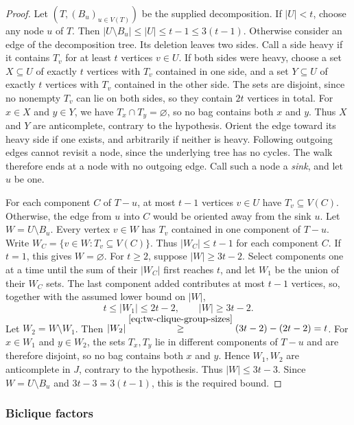 \begin{proof}
Let $(T,(B_u)_{u\in V(T)})$ be the supplied decomposition.
If $|U|<t$, choose any node $u$ of $T$. Then
$|U\setminus B_u|\leq|U|\leq t-1\leq3(t-1)$. Otherwise consider an edge of the
decomposition tree. Its deletion leaves two sides. Call a side
heavy if it contains $T_v$ for at least $t$ vertices $v\in U$.
If both sides were heavy, choose a set $X\subseteq U$ of exactly $t$
vertices with $T_v$ contained in one side, and a set
$Y\subseteq U$ of exactly $t$ vertices with $T_v$ contained in
the other side. The sets are disjoint, since no nonempty $T_v$ can
lie on both sides, so they contain $2t$ vertices in total. For
$x\in X$ and $y\in Y$, we have $T_x\cap T_y=\varnothing$, so no bag
contains both $x$ and $y$. Thus $X$ and $Y$ are anticomplete,
contrary to the hypothesis. Orient the edge toward its
heavy side if one exists, and arbitrarily if neither is heavy.
Following outgoing edges cannot revisit a node, since the underlying
tree has no cycles. The walk therefore ends at a node with no outgoing
edge. Call such a node a \emph{sink}, and let
$u$ be one.

For each component $C$ of $T-u$, at most $t-1$ vertices $v\in U$
have $T_v\subseteq V(C)$. Otherwise, the edge from $u$ into $C$ would be
oriented away from the sink $u$. Let $W=U\setminus B_u$. Every
vertex $v\in W$ has $T_v$ contained in one component of $T-u$.
Write $W_C=\{v\in W:T_v\subseteq V(C)\}$. Thus $|W_C|\leq t-1$ for
each component $C$. If $t=1$, this gives $W=\varnothing$. For
$t\geq2$, suppose $|W|\geq3t-2$. Select components one at a time
until the sum of their $|W_C|$ first reaches $t$, and let $W_1$ be
the union of their $W_C$ sets. The last component added contributes at most $t-1$
vertices, so, together with the assumed lower bound on $|W|$,
\begin{equation}\label{eq:tw-clique-group-sizes}
 t\leq|W_1|\leq2t-2,\qquad |W|\geq3t-2.
\end{equation}
Let $W_2=W\setminus W_1$. Then
$|W_2|\overset{\eqref{eq:tw-clique-group-sizes}}{\geq}(3t-2)-(2t-2)=t$.
For $x\in W_1$ and $y\in W_2$,
the sets $T_x,T_y$ lie in different components of $T-u$ and are
therefore disjoint, so no bag contains both $x$ and $y$. Hence $W_1,W_2$ are anticomplete in
$J$, contrary to the hypothesis. Thus $|W|\leq3t-3$.
Since $W=U\setminus B_u$ and $3t-3=3(t-1)$, this is the required bound.
\end{proof}

\subsubsection{Biclique factors}

